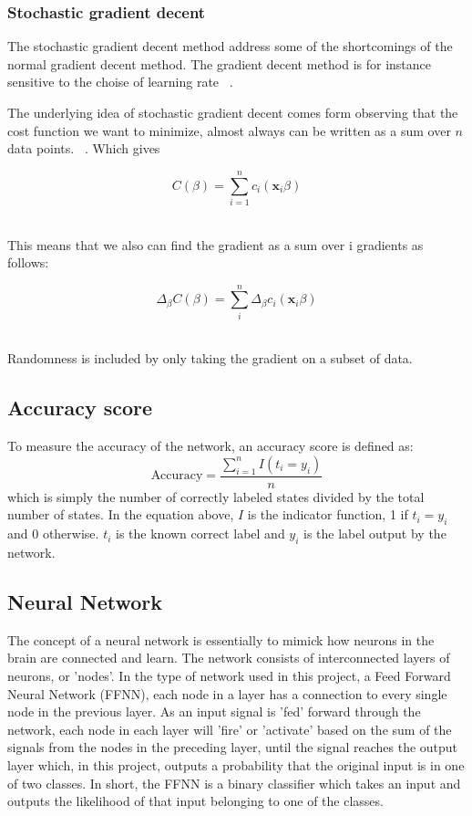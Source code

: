 \subsubsection{Stochastic gradient decent} 
The stochastic gradient decent method address some of the shortcomings 
of the normal gradient decent method. The gradient decent method is 
for instance sensitive to the choise of learning rate ~\cite{LectureNotes-FysStk}.

The underlying idea of stochastic gradient decent comes form observing
that the cost function we want to minimize, almost always can be written as 
a sum over \(n\) data points. ~\cite{LectureNotes-FysStk}. Which gives

\begin{equation}
	C(\beta) = \sum\limits_{i=1}^n c_i (\mathbf{x}_i\beta)
\end{equation} ~\cite{LectureNotes-FysStk}

This means that we also can find the gradient as a sum over i gradients
as follows: 

\begin{equation}
	\Delta_{\beta} C(\beta) = \sum\limits_{i}^n \Delta_{\beta}c_i (\mathbf{x}_i\beta)
\end{equation} ~\cite{LectureNotes-FysStk}

Randomness is included by only taking the gradient on a subset of data. 

\subsection{Accuracy score}\label{seq:accuracy} 
To measure the accuracy of the network, an accuracy score is defined as:
\begin{equation*}
	\text{Accuracy} = \frac{\sum_{i=1}^{n} I(t_i = y_i)}{n}
\end{equation*}
which is simply the number of correctly labeled states divided by the
total number of states. In the equation above, $I$ is the indicator function,
1 if $t_i = y_i$ and 0 otherwise. $t_i$ is the known correct label and $y_i$ is the
label output by the network.

\subsection{Neural Network}
The concept of a neural network is essentially to mimick how neurons in the
brain are connected and learn. The network consists of interconnected layers
of neurons, or 'nodes'. In the type of network used in this project, a
Feed Forward Neural Network (FFNN), each node in a layer has a connection to
every single node in the previous layer. As an input signal is 'fed' forward
through the network, each node in each layer will 'fire' or 'activate'
based on the sum of the signals from the nodes in the preceding layer, until
the signal reaches the output layer which, in this project, outputs a
probability that the original input is in one of two classes.
In short, the FFNN is a binary classifier which takes an input and outputs
the likelihood of that input belonging to one of the classes.

